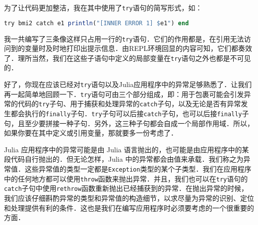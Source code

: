 为了让代码更加整洁，我在其中使用了\verb|try|语句的简写形式，如：

\begin{lstlisting}[language=julia]
try bmi2 catch e1 println("[INNER ERROR 1] $e1") end
\end{lstlisting}

我一共编写了三条像这样只占用一行的\verb|try|语句．它们的作用都是，在引用无法访问到的变量时及时地打印出提示信息．由REPL环境回显的内容可知，它们都奏效了．理所当然，我们在这些子语句中定义的局部变量在\verb|try|语句之外也都是不可见的．

好了，你现在应该已经对\verb|try|语句以及Julia应用程序中的异常足够熟悉了．让我们再一起简单地回顾一下．\verb|try|语句可由三个部分组成，即：用于包裹可能会引发异常的代码的\verb|try|子句、用于捕获和处理异常的\verb|catch|子句，以及无论是否有异常发生都会执行的\verb|finally|子句．\verb|try|子句可以后接\verb|catch|子句，也可以后接\verb|finally|子句，且至少要拼接一种子句．另外，这三种子句都会自成一个局部作用域．所以，如果你要在其中定义或引用变量，那就要多一份考虑了．

Julia 应用程序中的异常可能是由 Julia 语言抛出的，也可能是由应用程序中的某段代码自行抛出的．但无论怎样，Julia 中的异常都会由值来承载．我们称之为异常值．这些异常值的类型一定都是\verb|Exception|类型的某个子类型．我们在应用程序中的任何地方都可以使用\verb|throw|函数来抛出异常．并且，我们也可以在\verb|try|语句的\verb|catch|子句中使用\verb|rethrow|函数重新抛出已经捕获到的异常．在抛出异常的时候，我们应该仔细斟酌异常的类型和异常值的构造细节，以求尽量为异常的识别、定位和处理提供有利的条件．这也是我们在编写应用程序时必须要考虑的一个很重要的方面．